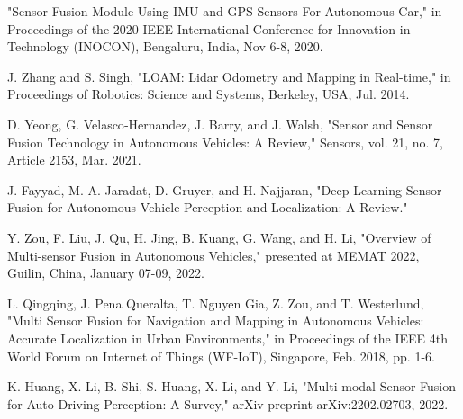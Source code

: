 \documentclass[letterpaper, 10 pt, conference]{ieeeconf}  %
\begin{document}
\begin{thebibliography}{99}

 "Sensor Fusion Module Using IMU and GPS Sensors For Autonomous Car," in Proceedings of the 2020 IEEE International Conference for Innovation in Technology (INOCON), Bengaluru, India, Nov 6-8, 2020.

 J. Zhang and S. Singh, "LOAM: Lidar Odometry and Mapping in Real-time," in Proceedings of Robotics: Science and Systems, Berkeley, USA, Jul. 2014.

 D. Yeong, G. Velasco‐Hernandez, J. Barry, and J. Walsh, "Sensor and Sensor Fusion Technology in Autonomous Vehicles: A Review," Sensors, vol. 21, no. 7, Article 2153, Mar. 2021.

 J. Fayyad, M. A. Jaradat, D. Gruyer, and H. Najjaran, "Deep Learning Sensor Fusion for Autonomous Vehicle Perception and Localization: A Review."

 Y. Zou, F. Liu, J. Qu, H. Jing, B. Kuang, G. Wang, and H. Li, "Overview of Multi-sensor Fusion in Autonomous Vehicles," presented at MEMAT 2022, Guilin, China, January 07-09, 2022.

 L. Qingqing, J. Pena Queralta, T. Nguyen Gia, Z. Zou, and T. Westerlund, "Multi Sensor Fusion for Navigation and Mapping in Autonomous Vehicles: Accurate Localization in Urban Environments," in Proceedings of the IEEE 4th World Forum on Internet of Things (WF-IoT), Singapore, Feb. 2018, pp. 1-6.

 K. Huang, X. Li, B. Shi, S. Huang, X. Li, and Y. Li, "Multi-modal Sensor Fusion for Auto Driving Perception: A Survey," arXiv preprint arXiv:2202.02703, 2022.

\end{thebibliography}
\end{document}
